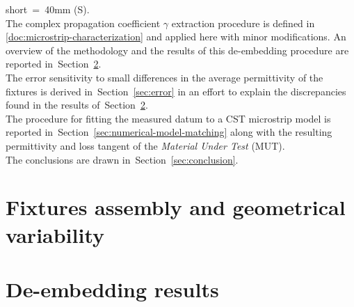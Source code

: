 \documentclass[11pt,a4paper]{article}
\newcommand{\sref}[1]{Section~\ref{#1}}
\begin{document}
    short~=~40mm (S).\\
    The complex propagation coefficient $\gamma$ extraction procedure is defined in \ref{doc:microstrip-characterization} and
    applied here with minor modifications.
    An overview of the methodology and the results of this de-embedding procedure are reported in~\sref{sec:de-embedding}.\\
    The error sensitivity to small differences in the average permittivity of the fixtures is derived in~\sref{sec:error}
    in an effort to explain the discrepancies found in the results of~\sref{sec:de-embedding}.\\
    The procedure for fitting the measured datum to a CST microstrip model is reported in~\sref{sec:numerical-model-matching}
    along with the resulting permittivity and loss tangent of the \emph{Material Under Test} (MUT).\\
    The conclusions are drawn in~\sref{sec:conclusion}.


    \section{Fixtures assembly and geometrical variability}
    \label{sec:assembly}


    \section{De-embedding results}
    \label{sec:de-embedding}


\end{document}
